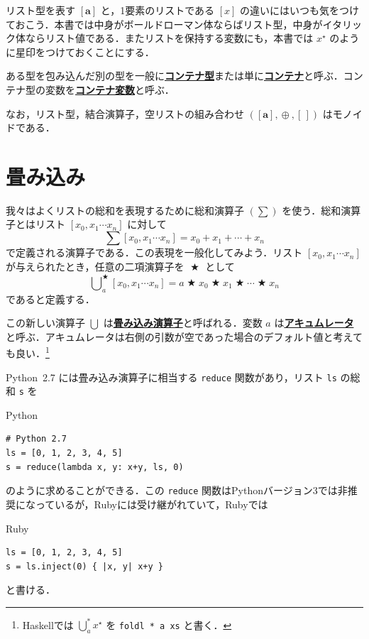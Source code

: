 \documentclass[a4paper,twocolumn]{jsbook}
\newcommand{\programminglanguage}[1]{\textsf{#1}}
\newcommand{\haskell}{\programminglanguage{Haskell}}
\newcommand{\python}{\programminglanguage{Python}}
\newcommand{\ruby}{\programminglanguage{Ruby}}
\newcommand{\keyword}[1]{{\underline{\textbf{#1}}}}
\newcommand{\code}[1]{\texttt{#1}}
\newenvironment{pythoncode}{\begin{itembox}[r]{\python}}{\end{itembox}}
\newenvironment{rubycode}{\begin{itembox}[r]{\ruby}}{\end{itembox}}
\newcommand{\mEmptyList}{{[\,]}}
\DeclareMathOperator{\mAppend}{\oplus}
\DeclareMathOperator{\mBinOp}{\bigstar}
\DeclareMathOperator*{\mFold}{\bigcup}
\newcommand{\mType}[1]{\mathbf{#1}}
\newcommand{\mListWith}[1]{\left[#1\right]}
\newcommand{\mTupleWith}[1]{\left(#1\right)}
\newcommand{\mListType}[1]{\mListWith{\mType{#1}}}
\newcommand{\mList}[1]{{#1}^\mathrm{\star}}
\begin{document}
リスト型を表す $\mListType{a}$ と，1要素のリストである $\mListWith{x}$ の違いにはいつも気をつけておこう．本書では中身がボールドローマン体ならばリスト型，中身がイタリック体ならリスト値である．またリストを保持する変数にも，本書では $\mList{x}$ のように星印をつけておくことにする．

ある型を包み込んだ別の型を一般に\keyword{コンテナ型}または単に\keyword{コンテナ}と呼ぶ．コンテナ型の変数を\keyword{コンテナ変数}と呼ぶ．

なお，リスト型，結合演算子，空リストの組み合わせ $\mTupleWith{\mListType{a},\mAppend,\mEmptyList}$ はモノイドである．

\section{畳み込み}

我々はよくリストの総和を表現するために総和演算子 $(\sum)$ を使う．総和演算子とはリスト $\mListWith{x_0,x_1\dotsb x_n}$ に対して
\begin{equation}
\sum\mListWith{x_0,x_1\dotsb x_n}=x_0+x_1+\dotsb+x_n
\end{equation}
で定義される演算子である．この表現を一般化してみよう．リスト $\mListWith{x_0,x_1\dotsb x_n}$ が与えられたとき，任意の二項演算子を $\mBinOp$ として
\begin{equation}
\mFold^{\mBinOp}_a\mListWith{x_0,x_1\dotsb x_n}
=a\mBinOp x_0\mBinOp x_1\mBinOp\dotsb\mBinOp x_n
\end{equation}
であると定義する．

この新しい演算子 $\mFold$ は\keyword{畳み込み演算子}と呼ばれる．変数 $a$ は\keyword{アキュムレータ}と呼ぶ．アキュムレータは右側の引数が空であった場合のデフォルト値と考えても良い．\footnote{\haskell では $\mFold^*_a\mList{x}$ を \code{foldl * a xs} と書く．}

\python\ 2.7 には畳み込み演算子に相当する \code{reduce} 関数があり，リスト \code{ls} の総和 \code{s} を
\begin{pythoncode}
\begin{verbatim}
# Python 2.7
ls = [0, 1, 2, 3, 4, 5]
s = reduce(lambda x, y: x+y, ls, 0)
\end{verbatim}
\end{pythoncode}
のように求めることができる．この \code{reduce} 関数は\python バージョン3では非推奨になっているが，\ruby には受け継がれていて，\ruby では
\begin{rubycode}
\begin{verbatim}
ls = [0, 1, 2, 3, 4, 5]
s = ls.inject(0) { |x, y| x+y }
\end{verbatim}
\end{rubycode}
と書ける．
\end{document}
